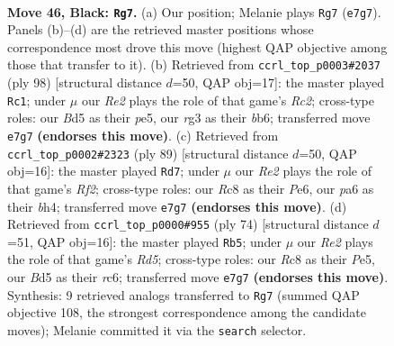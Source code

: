 \documentclass[11pt]{article}
\begin{document}
\clearpage

\begin{figure}[p]\centering
\begin{subfigure}{0.46\textwidth}\centering
\resizebox{\linewidth}{!}{%
\newchessgame
\chessboard[
  setfen={2r1k3/p1p1r3/P1p3p1/2Pb1p1p/1P3P1P/6R1/5K2/RN6 b - - 15 46},
  showmover=false,
  pgfstyle=straightmove, color=movearrow, markmove={e7-g7}
]}
\caption{}
\end{subfigure}\hfill
\begin{subfigure}{0.46\textwidth}\centering
\resizebox{\linewidth}{!}{%
\newchessgame
\chessboard[
  setfen={B7/3k1p2/1b1r1p1p/1p2pP2/1Pp5/p1P3P1/P1R1KP1P/8 w - - 26 50},
  showmover=false,
  pgfstyle=straightmove, color=movearrow, markmove={c2-c1}
]}
\caption{}
\end{subfigure}
\\[4pt]
\begin{subfigure}{0.46\textwidth}\centering
\resizebox{\linewidth}{!}{%
\newchessgame
\chessboard[
  setfen={8/2p2r1k/1p1pp2p/1P6/PK1Pp2B/3bP3/7P/2R5 b - - 14 45},
  showmover=false,
  pgfstyle=straightmove, color=movearrow, markmove={f7-d7}
]}
\caption{}
\end{subfigure}\hfill
\begin{subfigure}{0.46\textwidth}\centering
\resizebox{\linewidth}{!}{%
\newchessgame
\chessboard[
  setfen={8/pp5r/2r5/P2RPp1k/1p1P4/6Pp/7P/5RK1 w - - 3 38},
  showmover=false,
  pgfstyle=straightmove, color=movearrow, markmove={d5-b5}
]}
\caption{}
\end{subfigure}
\caption{\textbf{Move 46, Black: \texttt{Rg7}.} (a) Our position; Melanie plays \texttt{Rg7} (\texttt{e7g7}). Panels (b)--(d) are the retrieved master positions whose correspondence most drove this move (highest QAP objective among those that transfer to it). (b) Retrieved from \texttt{ccrl\_top\_p0003\#2037} (ply 98) [structural distance $d$=50, QAP obj=17]: the master played \texttt{Rc1}; under $\mu$ our \emph{Re2} plays the role of that game's \emph{Rc2}; cross-type roles: our \emph{B}d5 as their \emph{p}e5, our \emph{r}g3 as their \emph{b}b6; transferred move \texttt{e7g7} \textbf{(endorses this move)}. (c) Retrieved from \texttt{ccrl\_top\_p0002\#2323} (ply 89) [structural distance $d$=50, QAP obj=16]: the master played \texttt{Rd7}; under $\mu$ our \emph{Re2} plays the role of that game's \emph{Rf2}; cross-type roles: our \emph{R}c8 as their \emph{P}e6, our \emph{p}a6 as their \emph{b}h4; transferred move \texttt{e7g7} \textbf{(endorses this move)}. (d) Retrieved from \texttt{ccrl\_top\_p0000\#955} (ply 74) [structural distance $d$=51, QAP obj=16]: the master played \texttt{Rb5}; under $\mu$ our \emph{Re2} plays the role of that game's \emph{Rd5}; cross-type roles: our \emph{R}c8 as their \emph{P}e5, our \emph{B}d5 as their \emph{r}c6; transferred move \texttt{e7g7} \textbf{(endorses this move)}. Synthesis: 9 retrieved analogs transferred to \texttt{Rg7} (summed QAP objective 108, the strongest correspondence among the candidate moves); Melanie committed it via the \texttt{search} selector.}
\label{fig:thought-m91}
\end{figure}
\end{document}
